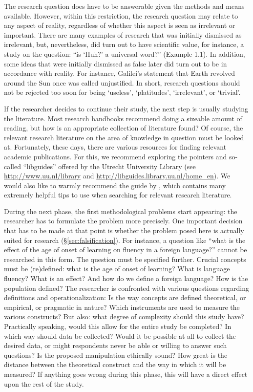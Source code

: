 \documentclass[
]{book}
\begin{document}
The research question does have to be answerable given the methods and means available. However, within this restriction, the research question may relate to any aspect of reality, regardless of whether this aspect is seen as irrelevant or important. There are many examples of research that was initially dismissed as irrelevant, but, nevertheless, did turn out to have scientific value, for instance, a study on the question: ``is `Huh?' a universal word?'' \citep{DTE13} (Example 1.1).
In addition, some ideas that were initially dismissed as false later did turn out to be in accordance with reality. For instance, Galilei's statement that Earth revolved around the Sun once was called unjustified. In short, research questions should not be rejected too soon for being `useless', `platitudes', `irrelevant', or `trivial'.

If the researcher decides to continue their study, the next step is usually studying the literature. Most research handbooks recommend doing a sizeable amount of reading, but how is an appropriate collection of literature found? Of course, the relevant research literature on the area of knowledge in question must be looked at. Fortunately, these days, there are various resources for finding relevant academic publications. For this, we recommend exploring the pointers and so-called ``libguides'' offered by the Utrecht University Library (see \url{http://www.uu.nl/library} and \url{http://libguides.library.uu.nl/home_en}). We would also like to warmly recommend the guide by \citet{Sand11}, which contains many extremely helpful tips to use when searching for relevant research literature.

During the next phase, the first methodological problems start appearing: the researcher has to formulate the problem more precisely. One important decision that has to be made at that point is whether the problem posed here is actually suited for research (§\ref{sec:falsification}). For instance, a question like ``what is the effect of the age of onset of learning on fluency in a foreign language?'' cannot be researched in this form. The question must be specified further. Crucial concepts must be (re)defined: what is the age of onset of learning? What is language fluency? What is an effect? And how do we define a foreign language? How is the population defined? The researcher is confronted with various questions regarding definitions and operationalization: Is the way concepts are defined theoretical, or empirical, or pragmatic in nature? Which instruments are used to measure the various constructs? But also: what degree of complexity should this study have? Practically speaking, would this allow for the entire study be completed? In which way should data be collected? Would it be possible at all to collect the desired data, or might respondents never be able or willing to answer such questions? Is the proposed manipulation ethically sound? How great is the distance between the theoretical construct and the way in which it will be measured? If anything goes wrong during this phase, this will have a direct effect upon the rest of the study.
\end{document}
